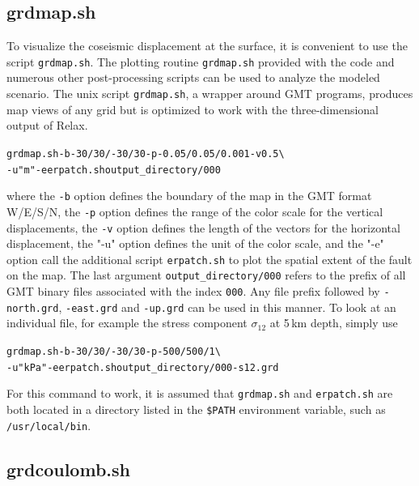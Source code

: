 \documentclass[10pt]{article}
\begin{document}
\subsection{grdmap.sh}

To visualize the coseismic displacement at the surface, it is convenient to use the script \verb'grdmap.sh'. The plotting routine \verb'grdmap.sh' provided with the code and numerous other post-processing scripts can be used to analyze the modeled scenario. The unix script \verb'grdmap.sh', a wrapper around GMT programs, produces map views of any grid but is optimized to work with the three-dimensional output of Relax.
\begin{alltt}
{\color{NavyBlue}grdmap.sh -b -30/30/-30/30 -p -0.05/0.05/0.001 -v 0.5 \textbackslash
       -u "m" -e erpatch.sh output_directory/000}
\end{alltt}
where the \verb'-b' option defines the boundary of the map in the GMT format W/E/S/N, the \verb'-p' option defines the range of the color scale for the vertical displacements, the \verb'-v' option defines the length of the vectors for the horizontal displacement, the "-u" option defines the unit of the color scale, and the "-e" option call the additional script \verb'erpatch.sh' to plot the spatial extent of the fault on the map. The last argument \verb'output_directory/000' refers to the prefix of all GMT binary files associated with the index \verb'000'. Any file prefix followed by \verb'-north.grd', \verb'-east.grd' and \verb'-up.grd' can be used in this manner. To look at an individual file, for example the stress component $\sigma_{12}$ at 5\,km depth, simply use
\begin{alltt}

{\color{NavyBlue}grdmap.sh -b -30/30/-30/30 -p -500/500/1 \textbackslash
       -u "kPa" -e erpatch.sh output_directory/000-s12.grd}
\end{alltt}
For this command to work, it is assumed that \verb'grdmap.sh' and \verb'erpatch.sh' are both located in a directory listed in the \verb'$PATH' environment variable, such as \verb'/usr/local/bin'.

\subsection{grdcoulomb.sh}
\end{document}
